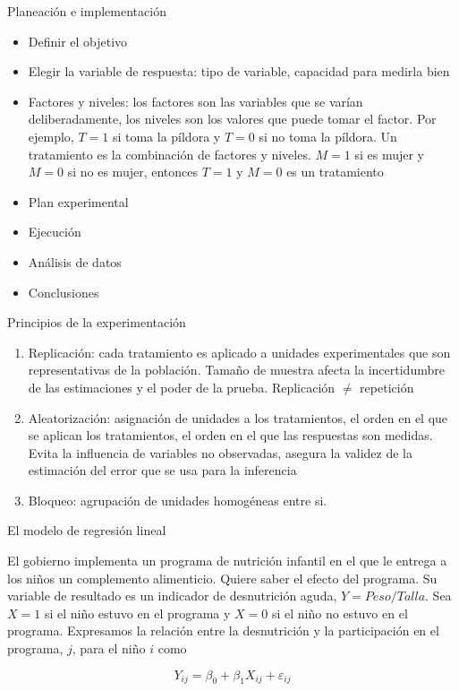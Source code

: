 \documentclass{beamer}
\begin{document}
\begin{frame}{Planeación e implementación}

\begin{itemize}
    \item Definir el objetivo
    \item Elegir la variable de respuesta: tipo de variable, capacidad para medirla bien
    \item Factores y niveles: los factores son las variables que se varían deliberadamente, los niveles son los valores que puede tomar el factor. Por ejemplo, $T=1$ si toma la píldora y $T=0$ si no toma la píldora. Un tratamiento es la combinación de factores y niveles. $M=1$ si es mujer y $M=0$ si no es mujer, entonces $T=1$ y $M=0$ es un tratamiento
    \item Plan experimental
    \item Ejecución
    \item Análisis de datos
    \item Conclusiones
\end{itemize}
    
\end{frame}

\begin{frame}{Principios de la experimentación}

\begin{enumerate}
    \item Replicación: cada tratamiento es aplicado a unidades experimentales que son representativas de la población. Tamaño de muestra afecta la incertidumbre de las estimaciones y el poder de la prueba. Replicación $\neq$ repetición
    \item Aleatorización: asignación de unidades a los tratamientos, el orden en el que se aplican los tratamientos, el orden en el que las respuestas son medidas. Evita la influencia de variables no observadas, asegura la validez de la estimación del error que se usa para la inferencia
    \item Bloqueo: agrupación de unidades homogéneas entre si. 
    

\end{enumerate}
    
\end{frame}

\begin{frame}{El modelo de regresión lineal}


El gobierno implementa un programa de nutrición infantil en el que le entrega a los niños un complemento alimenticio. Quiere saber el efecto del programa. Su variable de resultado es un indicador de desnutrición aguda, $Y=Peso/Talla$. Sea $X=1$ si el niño estuvo en el programa y $X=0$ si el niño no estuvo en el programa. Expresamos la relación entre la desnutrición y la participación en el programa, $j$, para el niño $i$ como

\begin{equation*}
    Y_{ij}=\beta_0+\beta_1X_{ij}+\varepsilon_{ij}
\end{equation*}

    
\end{frame}
\end{document}
